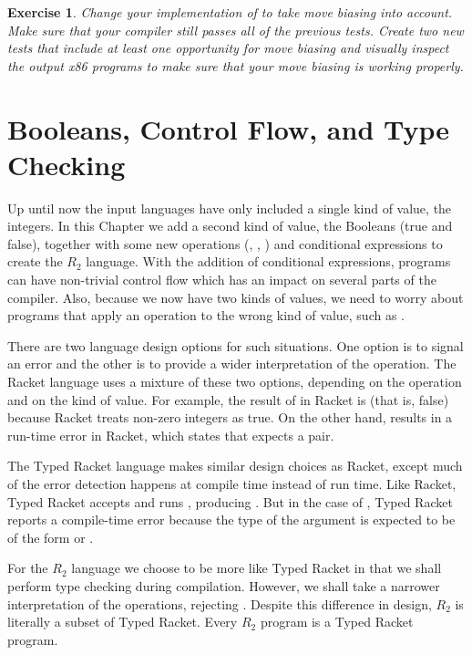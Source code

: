 \documentclass[11pt]{book}
\newtheorem{exercise}[theorem]{Exercise}
\begin{document}
\begin{exercise}\normalfont
Change your implementation of  to take move
biasing into account. Make sure that your compiler still passes all of
the previous tests. Create two new tests that include at least one
opportunity for move biasing and visually inspect the output x86
programs to make sure that your move biasing is working properly.
\end{exercise}



\chapter{Booleans, Control Flow, and Type Checking}
\label{ch:bool-types}

Up until now the input languages have only included a single kind of
value, the integers. In this Chapter we add a second kind of value,
the Booleans (true and false), together with some new operations
(, , ) and conditional expressions to create
the $R_2$ language.  With the addition of conditional expressions,
programs can have non-trivial control flow which has an impact on
several parts of the compiler. Also, because we now have two kinds of
values, we need to worry about programs that apply an operation to the
wrong kind of value, such as .

There are two language design options for such situations.  One option
is to signal an error and the other is to provide a wider
interpretation of the operation. The Racket language uses a mixture of
these two options, depending on the operation and on the kind of
value. For example, the result of  in Racket is
 (that is, false) because Racket treats non-zero integers as
true. On the other hand,  results in a run-time error in
Racket, which states that  expects a pair.

The Typed Racket language makes similar design choices as Racket,
except much of the error detection happens at compile time instead of
run time. Like Racket, Typed Racket accepts and runs ,
producing . But in the case of , Typed Racket
reports a compile-time error because the type of the argument is
expected to be of the form  or .

For the $R_2$ language we choose to be more like Typed Racket in that
we shall perform type checking during compilation.  However, we shall
take a narrower interpretation of the operations, rejecting
. Despite this difference in design,
$R_2$ is literally a subset of Typed Racket.  Every $R_2$
program is a Typed Racket program.
\end{document}

